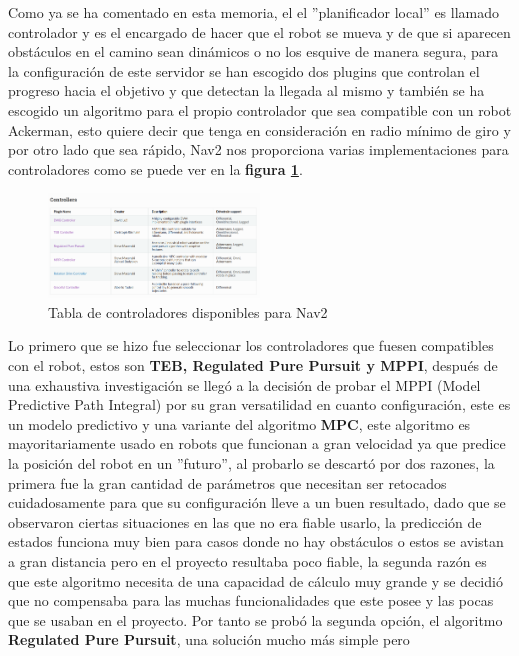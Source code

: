 Como ya se ha comentado en esta memoria, el el ''planificador local'' es llamado controlador y es el encargado de hacer que el robot se mueva 
y de que si aparecen obstáculos en el camino sean dinámicos o no los esquive de manera segura, para la configuración de este servidor se han escogido dos plugins 
que controlan el progreso hacia el objetivo y que detectan la llegada al mismo y también se ha escogido un algoritmo para el propio controlador 
que sea compatible con un robot Ackerman, esto quiere decir que tenga en consideración en radio mínimo de giro y por otro lado que sea rápido, Nav2 
nos proporciona varias implementaciones para controladores como se puede ver en la \textbf{figura \ref{fig:controllers_tabla}}. 
\begin{figure}[h]
    \centering
    \includegraphics[width=0.5\textwidth]{images/Controllers_tabla.png}
    \caption{Tabla de controladores disponibles para Nav2 \cite{nav2}}
    \label{fig:controllers_tabla}
\end{figure}
Lo primero que se hizo fue 
seleccionar los controladores que fuesen compatibles con el robot, estos son \textbf{TEB, Regulated Pure Pursuit y MPPI}, después de una exhaustiva investigación 
se llegó a la decisión de probar el MPPI (Model Predictive Path Integral) por su gran versatilidad en cuanto configuración, este es un modelo predictivo y una variante del algoritmo \textbf{MPC}, este algoritmo 
es mayoritariamente usado en robots que funcionan a gran velocidad ya que predice la posición del robot en un ''futuro'', al probarlo se descartó por dos 
razones, la primera fue la gran cantidad de parámetros que necesitan ser retocados cuidadosamente para que su configuración lleve a un buen resultado, dado que se observaron ciertas situaciones en las que no era fiable usarlo, la predicción 
de estados funciona muy bien para casos donde no hay obstáculos o estos se avistan a gran distancia pero en el proyecto resultaba poco fiable, la segunda razón 
es que este algoritmo necesita de una capacidad de cálculo muy grande y se decidió que no compensaba para las muchas funcionalidades que este posee y las pocas 
que se usaban en el proyecto. Por tanto se probó la segunda opción, el algoritmo \textbf{Regulated Pure Pursuit}, una solución mucho más simple pero 
